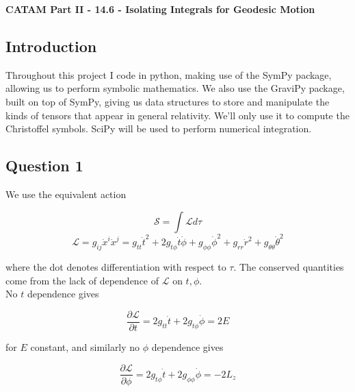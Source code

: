 \documentclass[10pt,a4paper]{report}
\begin{document}
\textbf{CATAM Part II - 14.6 - Isolating Integrals for Geodesic Motion}
\thispagestyle{empty}

\newpage

\subsection*{Introduction}

Throughout this project I code in python, making use of the SymPy package, allowing us to perform symbolic mathematics. We also use the GraviPy package, built on top of SymPy, giving us data structures to store and manipulate the kinds of tensors that appear in general relativity. We'll only use it to compute the Christoffel symbols. SciPy will be used to perform numerical integration. %

\subsection*{Question 1}

We use the equivalent action 

\begin{equation*}
\mathcal{S}=\int \mathcal{L} d\tau
\end{equation*}
\begin{equation*}
\mathcal{L}=g_{ij}\dot{x}^i\dot{x}^j = g_{tt}\dot{t}^2 + 2g_{t\phi}\dot{t}\dot{\phi}+g_{\phi\phi}\dot{\phi}^2+g_{rr}\dot{r}^2+g_{\theta\theta}\dot{\theta}^2
\end{equation*} 

where the dot denotes differentiation with respect to $\tau$. The conserved quantities come from the lack of dependence of $\mathcal{L}$ on $t, \phi$.\\

No $t$ dependence gives

\begin{equation}
\frac{\partial \mathcal{L}}{\partial t} = 2g_{tt}\dot{t} + 2g_{t\phi}\dot{\phi} = 2E
\label{Edef}
\end{equation}

for $E$ constant, and similarly no $\phi$ dependence gives 

\begin{equation}
\frac{\partial \mathcal{L}}{\partial \phi} = 2g_{t\phi}\dot{t}+2g_{\phi\phi}\dot{\phi} = -2L_z
\label{Ldef}
\end{equation}
\end{document}
